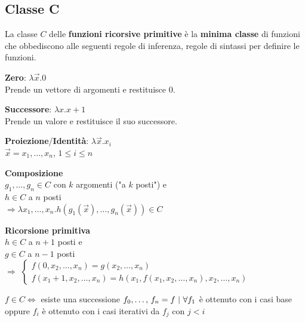 \documentclass[10pt]{book}
\begin{document}
\subsection{Classe C}
La classe $C$ delle \textbf{funzioni ricorsive primitive} è la \textbf{minima classe} di funzioni che obbediscono alle seguenti regole di inferenza, regole di sintassi per definire le funzioni.\\
\begin{list}{}{\textbf{Casi base}}
	\item \textbf{Zero}: $\lambda \overrightarrow{x}.0$\\
	Prende un vettore di argomenti e restituisce 0.
	\item \textbf{Successore}: $\lambda x.x+1$\\
	Prende un valore e restituisce il suo successore.
	\item \textbf{Proiezione}/\textbf{Identità}: $\lambda \overrightarrow{x}.x_i$\\
	$\overrightarrow{x} = x_1,\ldots, x_n$, $1 \leq i \leq n$
\end{list}
\begin{list}{}{\textbf{Casi iterativi}}
	\item \textbf{Composizione}\\
	$g_1,\ldots, g_n \in C$ con $k$ argomenti ("a $k$ posti") e\\
	$h \in C$ a $n$ posti\\
	$\Rightarrow \lambda x_1, \ldots, x_n.h(g_1(\overrightarrow{x}),\ldots, g_n(\overrightarrow{x})) \in C$
	\item \textbf{Ricorsione primitiva}\\
	$h \in C$ a $n + 1$ posti e\\
	$g \in C$ a $n - 1$ posti\\
	$\Rightarrow$
	\begin{math}
		\left\{
		\begin{array}{l}
			f(0, x_2, \ldots, x_n) = g(x_2, \ldots, x_n)\\
			f(x_1 + 1, x_2, \ldots, x_n) = h(x_1, f(x_1, x_2, \ldots, x_n), x_2,\ldots, x_n)
		\end{array}
		\right.
	\end{math}
\end{list}
$f \in C \Leftrightarrow$ esiste una successione $f_0,\ldots,\,f_n = f\:\:\vline\:\:\forall f_1$ è ottenuto con i casi base oppure $f_i$ è ottenuto con i casi iterativi da $f_j$ con $j < i$
\pagebreak
\end{document}

